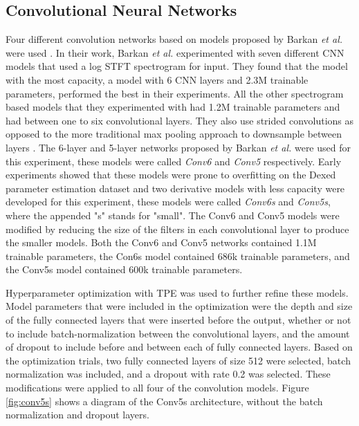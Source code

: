 \subsection{Convolutional Neural Networks}
Four different convolution networks based on models proposed by Barkan \textit{et al.} were used \cite{barkan2019inversynth}. In their work, Barkan \textit{et al.} experimented with seven different CNN models that used a log STFT spectrogram for input. They found that the model with the most capacity, a model with 6 CNN layers and 2.3M trainable parameters, performed the best in their experiments. All the other spectrogram based models that they experimented with had 1.2M trainable parameters and had between one to six convolutional layers. They also use strided convolutions as opposed to the more traditional max pooling approach to downsample between layers \cite{goodfellow2016deep}. The 6-layer and 5-layer networks proposed by Barkan \textit{et al.} were used for this experiment, these models were called \textit{Conv6} and \textit{Conv5} respectively. Early experiments showed that these models were prone to overfitting on the Dexed parameter estimation dataset and two derivative models with less capacity were developed for this experiment, these models were called \textit{Conv6s} and \textit{Conv5s}, where the appended "s" stands for "small". The Conv6 and Conv5 models were modified by reducing the size of the filters in each convolutional layer to produce the smaller models. Both the Conv6 and Conv5 networks contained 1.1M trainable parameters, the Con6s model contained 686k trainable parameters, and the Conv5s model contained 600k trainable parameters. 

Hyperparameter optimization with TPE was used to further refine these models. Model parameters that were included in the optimization were the depth and size of the fully connected layers that were inserted before the output, whether or not to include batch-normalization between the convolutional layers, and the amount of dropout to include before and between each of fully connected layers. Based on the optimization trials, two fully connected layers of size 512 were selected, batch normalization was included, and a dropout with rate 0.2 was selected. These modifications were applied to all four of the convolution models. Figure \ref{fig:conv5s} shows a diagram of the Conv5s architecture, without the batch normalization and dropout layers.

